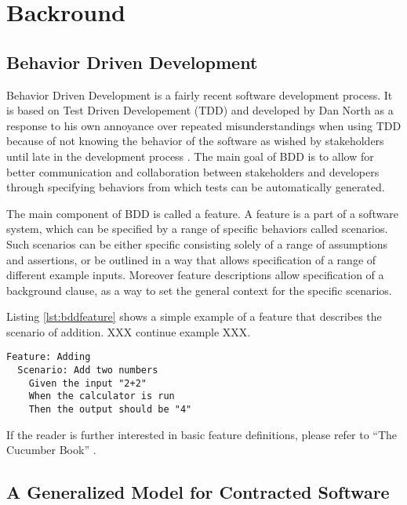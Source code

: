 \section{Backround}

\subsection{Behavior Driven Development}
\label{sub:bdd}
Behavior Driven Development is a fairly recent software development process. 
It is based on Test Driven Developement (TDD) and developed by Dan North as a response to his own annoyance over repeated misunderstandings when using TDD because of not knowing the behavior of the software as wished by stakeholders until late in the development process \cite{north2006}. 
The main goal of BDD is to allow for better communication and collaboration between stakeholders and developers through specifying behaviors from which tests can be automatically generated. 

The main component of BDD is called a feature. 
A feature is a part of a software system,
which can be specified by a range of specific behaviors called scenarios.
Such scenarios can be either specific consisting solely of a range of
assumptions and assertions, or be outlined in a way that allows
specification of a range of different example inputs.
Moreover feature descriptions allow specification of a background clause,
as a way to set the general context for the specific scenarios.

Listing \ref{lst:bddfeature} shows a simple example of a feature that describes the scenario of addition. XXX continue example XXX.

\begin{lstlisting}[caption={Sample Addition Feature},label={lst:bddfeature}]
Feature: Adding
  Scenario: Add two numbers
    Given the input "2+2"
    When the calculator is run 
    Then the output should be "4"
\end{lstlisting}

If the reader is further interested in basic feature definitions,
please refer to “The Cucumber Book” \cite{hellesoy2012}.

\subsection{A Generalized Model for Contracted Software}
\label{sub:AGeneralizedModelforContractedSoftware}


